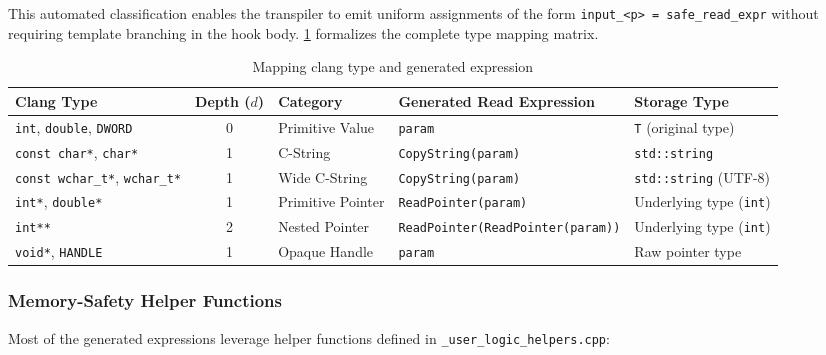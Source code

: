 This automated classification enables the transpiler to emit uniform assignments of the form \texttt{input\_<p> = safe\_read\_expr} without requiring template branching in the hook body.
\cref{tab:type_analysis_matrix} formalizes the complete type mapping matrix.

\begin{table}[H]
	\centering
	\small
	\begin{tabularx}{\textwidth}{@{} p{2.8cm} c p{2.5cm} >{\RaggedRight}X p{2.4cm} @{}}
		\toprule
		\textbf{Clang Type} & \textbf{Depth ($d$)} & \textbf{Category} & \textbf{Generated Read Expression} & \textbf{Storage Type} \\
		\midrule
		\texttt{int}, \texttt{double}, \texttt{DWORD} & 0 & Primitive Value & \texttt{param} & \texttt{T} (original type) \\
		\addlinespace
		\texttt{const char*}, \texttt{char*} & 1 & C-String & \texttt{CopyString(param)} & \texttt{std::string} \\
		\addlinespace
		\texttt{const wchar\_t*}, \texttt{wchar\_t*} & 1 & Wide C-String & \texttt{CopyString(param)} & \texttt{std::string} (UTF-8) \\
		\addlinespace
		\texttt{int*}, \texttt{double*} & 1 & Primitive Pointer & \texttt{ReadPointer(param)} & Underlying type (\texttt{int}) \\
		\addlinespace
		\texttt{int**} & 2 & Nested Pointer & \texttt{ReadPointer(}\allowbreak\texttt{ReadPointer(param))} & Underlying type (\texttt{int}) \\
		\addlinespace
		\texttt{void*}, \texttt{HANDLE} & 1 & Opaque Handle & \texttt{param} & Raw pointer type \\
		\bottomrule
	\end{tabularx}
	\caption{Mapping clang type and generated expression}
	\label{tab:type_analysis_matrix}
\end{table}

\subsubsection{Memory-Safety Helper Functions}

Most of the generated expressions leverage helper functions defined in \texttt{\_user\_logic\_}\allowbreak\texttt{helpers.cpp}:

